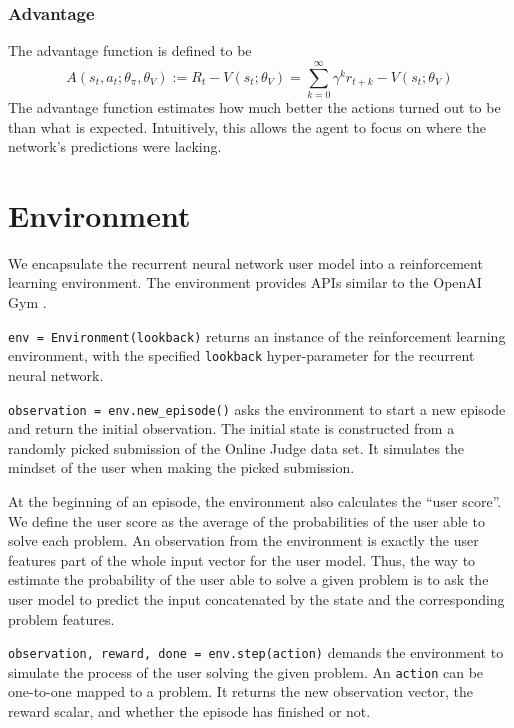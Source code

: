         \subsubsection{Advantage}

            The advantage function is defined to be
            \[
            A(s_t,a_t;\theta_{\pi},\theta_V) := R_t - V(s_t;\theta_V)
            = \sum_{k=0}^{\infty} \gamma^k r_{t+k} - V(s_t;\theta_V)
            \]
            The advantage function estimates how much better the actions turned out to be than what is expected.
            Intuitively, this allows the agent to focus on where the network's predictions were lacking.



\section{Environment}
\label{sec:policy/environment}

    We encapsulate the recurrent neural network user model into a reinforcement learning environment.
    The environment provides APIs similar to the OpenAI Gym \cite{brockman_openai_2016}.

    \verb|env = Environment(lookback)| returns an instance of the reinforcement learning environment,
    with the specified \verb|lookback| hyper-parameter for the recurrent neural network.

    \verb|observation = env.new_episode()| asks the environment to start a new episode and return the initial observation.
    The initial state is constructed from a randomly picked submission of the Online Judge data set.
    It simulates the mindset of the user when making the picked submission.

    At the beginning of an episode, the environment also calculates the ``user score''.
    We define the user score as the average of the probabilities of the user able to solve each problem.
    An observation from the environment is exactly the user features part of the whole input vector for the user model.
    Thus, the way to estimate the probability of the user able to solve a given problem
    is to ask the user model to predict the input concatenated by the state and the corresponding problem features.

    \verb|observation, reward, done = env.step(action)|
    demands the environment to simulate the process of the user solving the given problem.
    An \verb|action| can be one-to-one mapped to a problem.
    It returns the new observation vector, the reward scalar, and whether the episode has finished or not.


